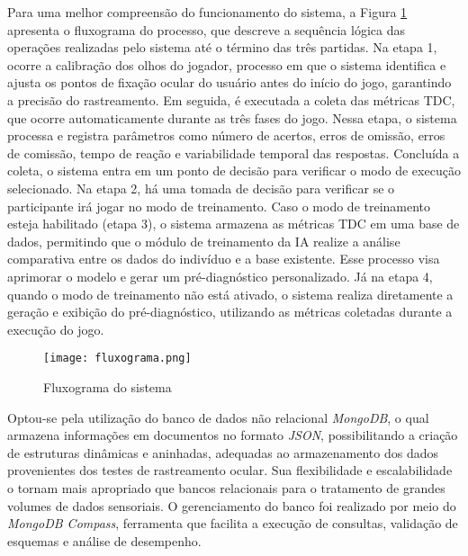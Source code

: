 Para uma melhor compreensão do funcionamento do sistema, a Figura \ref{fig:fluxograma} apresenta o fluxograma do processo, que descreve a sequência lógica das operações realizadas pelo sistema até o término das três partidas. Na etapa 1, ocorre a calibração dos olhos do jogador, processo em que o sistema identifica e ajusta os pontos de fixação ocular do usuário antes do início do jogo, garantindo a precisão do rastreamento. Em seguida, é executada a coleta das métricas TDC, que ocorre automaticamente durante as três fases do jogo. Nessa etapa, o sistema processa e registra parâmetros como número de acertos, erros de omissão, erros de comissão, tempo de reação e variabilidade temporal das respostas. Concluída a coleta, o sistema entra em um ponto de decisão para verificar o modo de execução selecionado. Na etapa 2, há uma tomada de decisão para verificar se o participante irá jogar no modo de treinamento. Caso o modo de treinamento esteja habilitado (etapa 3), o sistema armazena as métricas TDC em uma base de dados, permitindo que o módulo de treinamento da IA realize a análise comparativa entre os dados do indivíduo e a base existente. Esse processo visa aprimorar o modelo e gerar um pré-diagnóstico personalizado. Já na etapa 4, quando o modo de treinamento não está ativado, o sistema realiza diretamente a geração e exibição do pré-diagnóstico, utilizando as métricas coletadas durante a execução do jogo.

\begin{figure}[H]
    \centering
    \caption{Fluxograma do sistema}%
    \label{fig:fluxograma}
    \texttt{[image: fluxograma.png]}%
\end{figure}

Optou-se pela utilização do banco de dados não relacional \textit{MongoDB}, o qual armazena informações em documentos no formato \textit{JSON}, possibilitando a criação de estruturas dinâmicas e aninhadas, adequadas ao armazenamento dos dados provenientes dos testes de rastreamento ocular. Sua flexibilidade e escalabilidade o tornam mais apropriado que bancos relacionais para o tratamento de grandes volumes de dados sensoriais. O gerenciamento do banco foi realizado por meio do \textit{MongoDB Compass}, ferramenta que facilita a execução de consultas, validação de esquemas e análise de desempenho.
